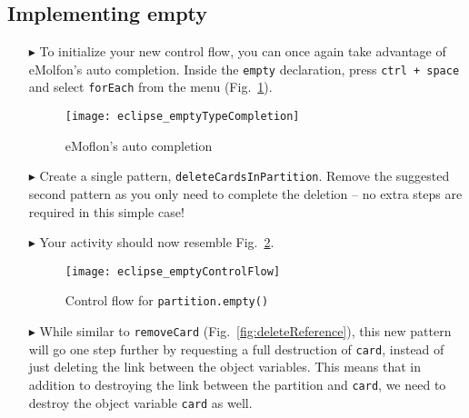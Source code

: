 \newpage
\hypertarget{emptyPartition tex}{}
\subsection{Implementing empty}
\texHeader

\begin{itemize}
 
\item[$\blacktriangleright$] To initialize your new control flow, you can once again take advantage of eMolfon's auto completion. Inside the
\texttt{empty} declaration, press  \texttt{ctrl + space} and select \texttt{forEach} from the menu (Fig.~\ref{fig:typeCompletion}).

\vspace{1cm}

\begin{figure}[htpb]
\begin{center}
  \texttt{[image: eclipse\_emptyTypeCompletion]}
  \caption{eMoflon's auto completion}
  \label{fig:typeCompletion}
\end{center}
\end{figure}

\vspace{1cm}

\item[$\blacktriangleright$] Create a single pattern, \texttt{deleteCardsInPartition}. Remove the suggested second pattern as you only need to complete the
deletion -- no extra steps are required in this simple case!

\item[$\blacktriangleright$] Your activity should now resemble Fig.~\ref{fig:emptyControlFlow}.

\clearpage

\begin{figure}[htpb]
\begin{center}
  \texttt{[image: eclipse\_emptyControlFlow]}
  \caption{Control flow for \texttt{partition.empty()}}
  \label{fig:emptyControlFlow}
\end{center}
\end{figure}

\item[$\blacktriangleright$] While similar to \texttt{removeCard} (Fig.~\ref{fig:deleteReference}), this new pattern will go one step further by requesting a
full destruction of \texttt{card}, instead of just deleting the link between the object variables. This means that in addition to destroying the link between
the partition and \texttt{card}, we need to destroy the object variable \texttt{card} as well.


\end{itemize}
